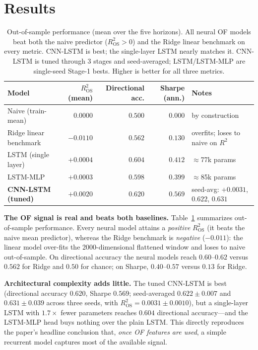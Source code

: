 \documentclass[10pt,twocolumn]{article}
\begin{document}
\section{Results}

\begin{table}[t]
\centering\small
\caption{Out-of-sample performance (mean over the five horizons). All neural OF
models beat both the naive predictor ($R^2_{\mathrm{OS}}>0$) and the Ridge linear
benchmark on every metric. CNN-LSTM is best; the single-layer LSTM nearly matches
it. CNN-LSTM is tuned through 3 stages and seed-averaged; LSTM/LSTM-MLP are
single-seed Stage-1 bests. Higher is better for all three metrics.}
\label{tab:main}
\begin{tabular}{lrrrl}
\toprule
Model & $R^2_{\mathrm{OS}}$ (mean) & Directional acc. & Sharpe (ann.) & Notes \\
\midrule
Naive (train-mean)        & $0.0000$  & $0.500$ & $0.000$ & by construction \\
Ridge linear benchmark    & $-0.0110$ & $0.562$ & $0.130$ & overfits; loses to naive on $R^2$ \\
LSTM (single layer)       & $+0.0004$ & $0.604$ & $0.412$ & $\approx$77k params \\
LSTM-MLP                  & $+0.0003$ & $0.598$ & $0.399$ & $\approx$85k params \\
\textbf{CNN-LSTM (tuned)} & $\mathbf{+0.0020}$ & $\mathbf{0.620}$ & $\mathbf{0.569}$ & seed-avg: $+0.0031$, $0.622$, $0.631$ \\
\bottomrule
\end{tabular}
\end{table}

\textbf{The OF signal is real and beats both baselines.} Table~\ref{tab:main}
summarizes out-of-sample performance. Every neural model attains a
\emph{positive} $R^2_{\mathrm{OS}}$ (it beats the naive mean predictor), whereas
the Ridge benchmark is \emph{negative} ($-0.011$): the linear model over-fits the
2000-dimensional flattened window and loses to naive out-of-sample. On directional
accuracy the neural models reach $0.60$--$0.62$ versus $0.562$ for Ridge and
$0.50$ for chance; on Sharpe, $0.40$--$0.57$ versus $0.13$ for Ridge.

\textbf{Architectural complexity adds little.} The tuned CNN-LSTM is best
(directional accuracy $0.620$, Sharpe $0.569$; seed-averaged $0.622\pm0.007$ and
$0.631\pm0.039$ across three seeds, with $R^2_{\mathrm{OS}}=0.0031\pm0.0010$), but
a single-layer LSTM with $1.7\times$ fewer parameters reaches $0.604$ directional
accuracy---and the LSTM-MLP head buys nothing over the plain LSTM. This directly
reproduces the paper's headline conclusion that, \emph{once OF features are used},
a simple recurrent model captures most of the available signal.
\end{document}
